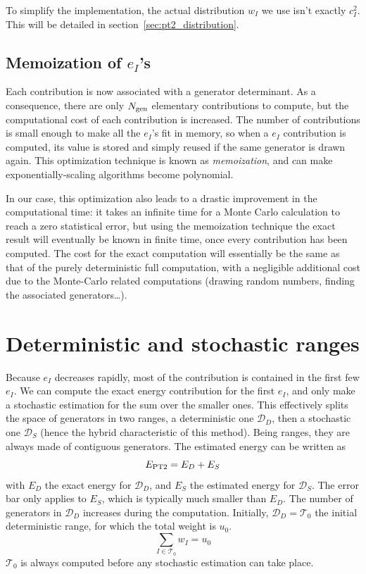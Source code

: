 \documentclass[./thesis.tex]{subfiles}
\begin{document}
To simplify the implementation, the actual distribution $w_I$ we use isn't exactly $c_I^2$. This will be detailed in section~\ref{sec:pt2_distribution}.



\subsection{Memoization of $e_I$'s}

Each contribution is now associated with a generator determinant. As a consequence, there are only ${N_\text{gen}}$ elementary contributions to compute, but the computational cost of each contribution is increased.
The number of contributions is small enough to make all the $e_I$'s fit in memory, so when a $e_I$ contribution is computed, its value is stored and simply reused if the same generator is drawn again. This optimization technique is known as \emph{memoization},\cite{Michie1968Apr} and can make exponentially-scaling algorithms become polynomial.\cite{Frost1994}

In our case, this optimization also leads to a drastic improvement in the computational time: it takes an infinite time for a Monte Carlo calculation to reach a zero statistical error, but using the memoization technique the exact result will eventually be known in finite time, once every contribution has been computed. The cost for the exact computation will essentially be the same as that of the purely deterministic full computation, with a negligible additional cost due to the Monte-Carlo related computations (drawing random numbers, finding the associated generators\dots).



\section{Deterministic and stochastic ranges}
Because $e_I$ decreases rapidly, most of the contribution is contained in the first few $e_I$. We can compute the exact energy contribution for the first $e_I$, and only make a stochastic estimation for the sum over the smaller ones. This effectively splits the space of generators in two ranges, a deterministic one $\mathcal{D}_D$, then a stochastic one $\mathcal{D}_S$ (hence the hybrid characteristic of this method). Being ranges, they are always made of contiguous generators. The estimated energy can be written as
\begin{equation}
E_\text{PT2} = E_D + E_S
\end{equation}
with $E_D$ the exact energy for $\mathcal{D}_D$, and $E_S$ the estimated energy for $\mathcal{D}_S$. The error bar only applies to $E_S$, which is typically much smaller than $E_D$.
The number of generators in $\mathcal{D}_D$ increases during the computation. Initially, $\mathcal{D}_D=\mathcal{T}_0$ the initial deterministic range, for which the total weight is $u_0$.
\begin{equation}
\sum_{I \in \mathcal{T}_0} w_I=u_0
\end{equation}
$\mathcal{T}_0$ is always computed before any stochastic estimation can take place.
\end{document}
